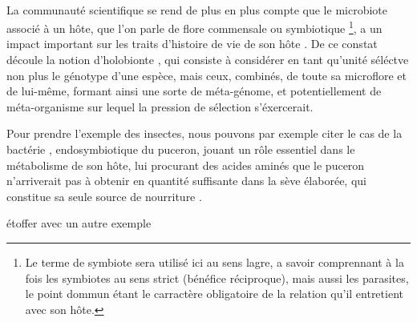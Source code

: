 
\paragraph{} %
\label{par:intro1}

La communauté scientifique se rend de plus en plus compte que le microbiote
associé à un hôte, que l'on parle de flore commensale ou symbiotique
\footnote{Le terme de symbiote sera utilisé ici au sens lagre, a savoir
comprennant à la fois les symbiotes au sens strict (bénéfice réciproque), mais
aussi les parasites, le point dommun étant le carractère obligatoire de la
relation qu'il entretient avec son hôte.}, a un impact important sur les
traits d'histoire de vie de son hôte \cite{feldhaar2011}. De ce constat
découle la notion d'holobionte \cite{rosenberg2007}, qui consiste à considérer
en tant qu'unité séléctve non plus le génotype d'une espèce, mais ceux,
combinés, de toute sa microflore et de lui-même, formant ainsi une sorte de
méta-génome, et potentiellement de méta-organisme sur lequel la pression de
sélection s'éxercerait.

Pour prendre l'exemple des insectes, nous pouvons par exemple citer le cas de
la bactérie ,  endosymbiotique du puceron, jouant un rôle
essentiel dans le métabolisme de son hôte, lui procurant des acides aminés que
le puceron n'arriverait pas à obtenir en quantité suffisante dans la sève
élaborée, qui constitue sa seule source de nourriture \cite{douglas1998}.

\begin{note}étoffer avec un autre exemple\end{note}



